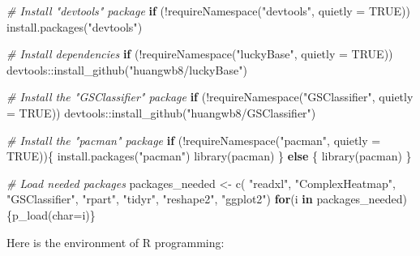 \documentclass[
  12pt,
]{book}
\newenvironment{Shaded}{\begin{snugshade}}{\end{snugshade}}
\newcommand{\AttributeTok}[1]{\textcolor[rgb]{0.77,0.63,0.00}{#1}}
\newcommand{\CommentTok}[1]{\textcolor[rgb]{0.56,0.35,0.01}{\textit{#1}}}
\newcommand{\ConstantTok}[1]{\textcolor[rgb]{0.00,0.00,0.00}{#1}}
\newcommand{\ControlFlowTok}[1]{\textcolor[rgb]{0.13,0.29,0.53}{\textbf{#1}}}
\newcommand{\FunctionTok}[1]{\textcolor[rgb]{0.00,0.00,0.00}{#1}}
\newcommand{\NormalTok}[1]{#1}
\newcommand{\OtherTok}[1]{\textcolor[rgb]{0.56,0.35,0.01}{#1}}
\newcommand{\SpecialCharTok}[1]{\textcolor[rgb]{0.00,0.00,0.00}{#1}}
\newcommand{\StringTok}[1]{\textcolor[rgb]{0.31,0.60,0.02}{#1}}
\begin{document}
\begin{Shaded}
\begin{Highlighting}[]

\CommentTok{\# Install "devtools" package}
\ControlFlowTok{if}\NormalTok{ (}\SpecialCharTok{!}\FunctionTok{requireNamespace}\NormalTok{(}\StringTok{"devtools"}\NormalTok{, }\AttributeTok{quietly =} \ConstantTok{TRUE}\NormalTok{))}
  \FunctionTok{install.packages}\NormalTok{(}\StringTok{"devtools"}\NormalTok{)}

\CommentTok{\# Install dependencies}
\ControlFlowTok{if}\NormalTok{ (}\SpecialCharTok{!}\FunctionTok{requireNamespace}\NormalTok{(}\StringTok{"luckyBase"}\NormalTok{, }\AttributeTok{quietly =} \ConstantTok{TRUE}\NormalTok{))}
\NormalTok{  devtools}\SpecialCharTok{::}\FunctionTok{install\_github}\NormalTok{(}\StringTok{"huangwb8/luckyBase"}\NormalTok{)}

\CommentTok{\# Install the "GSClassifier" package}
\ControlFlowTok{if}\NormalTok{ (}\SpecialCharTok{!}\FunctionTok{requireNamespace}\NormalTok{(}\StringTok{"GSClassifier"}\NormalTok{, }\AttributeTok{quietly =} \ConstantTok{TRUE}\NormalTok{))}
\NormalTok{  devtools}\SpecialCharTok{::}\FunctionTok{install\_github}\NormalTok{(}\StringTok{"huangwb8/GSClassifier"}\NormalTok{)}

\CommentTok{\# Install the "pacman" package}
\ControlFlowTok{if}\NormalTok{ (}\SpecialCharTok{!}\FunctionTok{requireNamespace}\NormalTok{(}\StringTok{"pacman"}\NormalTok{, }\AttributeTok{quietly =} \ConstantTok{TRUE}\NormalTok{))\{}
  \FunctionTok{install.packages}\NormalTok{(}\StringTok{"pacman"}\NormalTok{)}
  \FunctionTok{library}\NormalTok{(pacman)}
\NormalTok{\} }\ControlFlowTok{else}\NormalTok{ \{}
  \FunctionTok{library}\NormalTok{(pacman)}
\NormalTok{\}}

\CommentTok{\# Load needed packages}
\NormalTok{packages\_needed }\OtherTok{\textless{}{-}} \FunctionTok{c}\NormalTok{(}
  \StringTok{"readxl"}\NormalTok{,}
  \StringTok{"ComplexHeatmap"}\NormalTok{,}
  \StringTok{"GSClassifier"}\NormalTok{,}
  \StringTok{"rpart"}\NormalTok{,}
  \StringTok{"tidyr"}\NormalTok{,}
  \StringTok{"reshape2"}\NormalTok{,}
  \StringTok{"ggplot2"}\NormalTok{)}
\ControlFlowTok{for}\NormalTok{(i }\ControlFlowTok{in}\NormalTok{ packages\_needed)\{}\FunctionTok{p\_load}\NormalTok{(}\AttributeTok{char=}\NormalTok{i)\}}
\end{Highlighting}
\end{Shaded}

Here is the environment of R programming:
\end{document}
